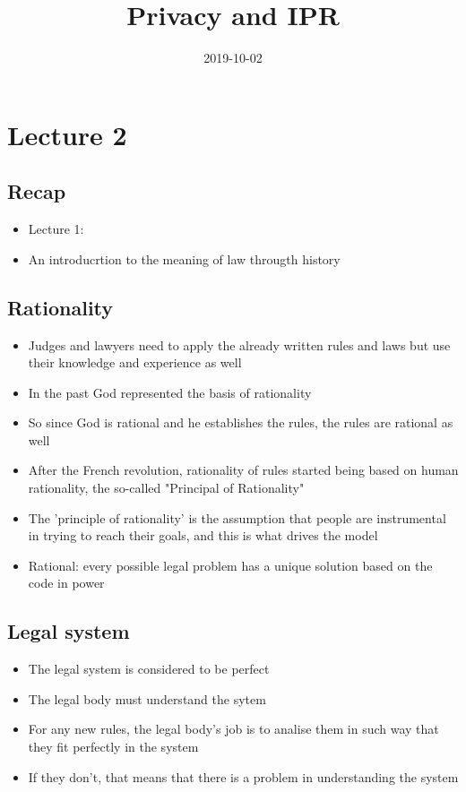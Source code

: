 \documentclass{article}
\title{Privacy and IPR}
\date{2019-10-02}
\begin{document}
   \maketitle 
   \newpage

\section{Lecture 2}

\subsection{Recap}
\begin{itemize}
\item Lecture 1:
\item An introducrtion to the meaning of law througth history 
\end{itemize}

\subsection{Rationality}

\begin{itemize}
\item Judges and lawyers need to apply the already written rules and laws but use their knowledge and experience as well
\item In the past God represented the basis of rationality
\item So since God is rational and he establishes the rules, the rules are rational as well
\item After the French revolution, rationality of rules started being based on human rationality, the so-called "Principal of Rationality"
\item The 'principle of rationality' is the assumption that people are instrumental in trying to reach their goals, and this is what drives the model
\item Rational: every possible legal problem has a unique solution based on the code in power 
\end{itemize}

\subsection{Legal system}
\begin{itemize}
\item The legal system is considered to be perfect 
\item The legal body must understand the sytem 
\item For any new rules, the legal body's job is to analise them in such way that they fit perfectly in the system
\item If they don't, that means that there is a problem in understanding the system 
\end{itemize}
\end{document}

